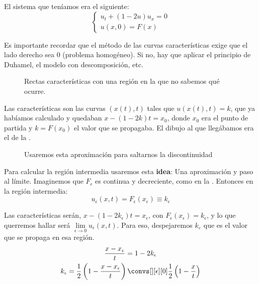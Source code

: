 			\begin{example}
				El sistema que teníamos era el siguiente:
				\[
				\begin{cases} u_t + (1-2u)u_x = 0 \\
				u(x,0) = F(x)
				\end{cases} \]

				\obs Es importante recordar que el método de las curvas características exige que el lado derecho sea 0 (problema homogéneo). Si no, hay que aplicar el principio de Duhamel, el modelo con descomposición, etc.

				\begin{figure}[hbtp]
					\centering
					\caption{Rectas características con una región en la que no sabemos qué ocurre.}
					\label{fig:caracteristicasSemaforo2}
				\end{figure}

				Las características son las curvas $(x(t),t)$ tales que $u(x(t),t) = k$, que ya habíamos calculado y quedaban $x - (1-2k)t = x_0$, donde $x_0$ era el punto de partida y $k = F(x_0)$ el valor que se propagaba. El dibujo al que llegábamos era el de la .

				\begin{wrapfigure}{L}{0.3\textwidth}
					\centering
					\caption{Usaremos esta aproximación para saltarnos la discontinuidad}
					\label{fig:FEpsilon}
				\end{wrapfigure}

				Para calcular la región intermedia usaremos esta \textbf{idea}: Una aproximación y paso al límite. Imaginemos que $F_\epsilon$ es continua y decreciente, como en la . Entonces en la región intermedia:
				\[ u_\epsilon (x,t) = F_\epsilon (x_\epsilon) \equiv k_\epsilon \]

				Las características serán,  $x - (1-2k_\epsilon) t = x_\epsilon$, con $F_\epsilon(x_\epsilon) = k_\epsilon$, y lo que querremos hallar será $\lim\limits_{\epsilon \rightarrow 0} u_\epsilon(x,t)$. Para eso, despejaremos $k_ε$ que es el valor que se propaga en esa región.
				\begin{gather*}
				\frac{x - x_\epsilon}{t} = 1-2k_\epsilon \\
				k_\epsilon = \frac{1}{2} \left(1 - \frac{x-x_\epsilon}{t}\right) \convs[][\epsilon][0] \frac{1}{2} \left(1 - \frac{x}{t} \right)
				\end{gather*}


\end{example}
